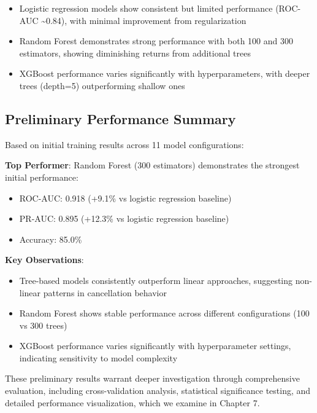 \documentclass[
  letterpaper,
  DIV=11,
  numbers=noendperiod]{scrartcl}
\providecommand{\tightlist}{%
  \setlength{\itemsep}{0pt}\setlength{\parskip}{0pt}}
\begin{document}
\begin{itemize}
\tightlist
\item
  Logistic regression models show consistent but limited performance
  (ROC-AUC \textasciitilde0.84), with minimal improvement from
  regularization
\item
  Random Forest demonstrates strong performance with both 100 and 300
  estimators, showing diminishing returns from additional trees
\item
  XGBoost performance varies significantly with hyperparameters, with
  deeper trees (depth=5) outperforming shallow ones
\end{itemize}

\subsection{Preliminary Performance
Summary}\label{preliminary-performance-summary}

Based on initial training results across 11 model configurations:

\textbf{Top Performer}: Random Forest (300 estimators) demonstrates the
strongest initial performance:

\begin{itemize}
\tightlist
\item
  ROC-AUC: 0.918 (+9.1\% vs logistic regression baseline)
\item
  PR-AUC: 0.895 (+12.3\% vs logistic regression baseline)\\
\item
  Accuracy: 85.0\%
\end{itemize}

\textbf{Key Observations}:

\begin{itemize}
\tightlist
\item
  Tree-based models consistently outperform linear approaches,
  suggesting non-linear patterns in cancellation behavior
\item
  Random Forest shows stable performance across different configurations
  (100 vs 300 trees)
\item
  XGBoost performance varies significantly with hyperparameter settings,
  indicating sensitivity to model complexity
\end{itemize}

These preliminary results warrant deeper investigation through
comprehensive evaluation, including cross-validation analysis,
statistical significance testing, and detailed performance
visualization, which we examine in Chapter 7.
\end{document}
